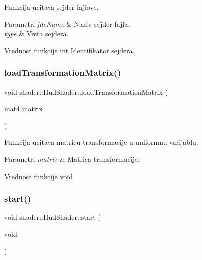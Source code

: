 Funkcija ucitava sejder fajlove. 


\begin{DoxyParams}{Parametri}
{\em file\+Name} & Naziv sejder fajla. \\
\hline
{\em type} & Vrsta sejdera. \\
\hline
\end{DoxyParams}
\begin{DoxyReturn}{Vrednost funkcije}
int Identifikator sejdera. 
\end{DoxyReturn}
\mbox{\label{classshader_1_1HudShader_a000e6fafa088f6fdd9f9554da408431e}} 
\subsubsection{\texorpdfstring{load\+Transformation\+Matrix()}{loadTransformationMatrix()}}
{\footnotesize\ttfamily void shader\+::\+Hud\+Shader\+::load\+Transformation\+Matrix (\begin{DoxyParamCaption}\item[{mat4}]{matrix }\end{DoxyParamCaption})}



Funkcija ucitava matricu transformacije u uniformnu varijablu. 


\begin{DoxyParams}{Parametri}
{\em matrix} & Matrica transformacije. \\
\hline
\end{DoxyParams}
\begin{DoxyReturn}{Vrednost funkcije}
void 
\end{DoxyReturn}
\mbox{\label{classshader_1_1HudShader_a5c77dcdc917ba6890d210ae028cd0eba}} 
\subsubsection{\texorpdfstring{start()}{start()}}
{\footnotesize\ttfamily void shader\+::\+Hud\+Shader\+::start (\begin{DoxyParamCaption}\item[{void}]{ }\end{DoxyParamCaption})}



